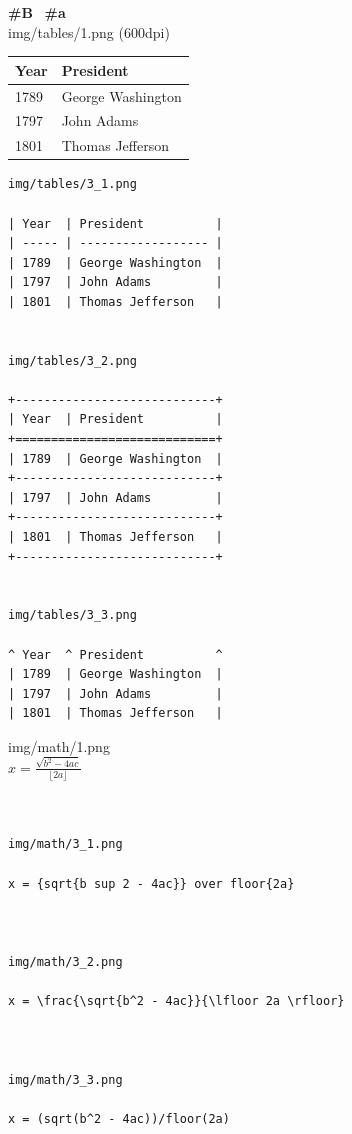 \documentclass[14pt]{article}
\begin{document}
\textbf{\#B} \ \textbf{\#a}\\[1cm]
img/tables/1.png (600dpi)
\begin{table}[H]
\begin{tabular}{| l | l |}
\hline
Year & President \\
\hline
1789 & George Washington \\
\hline
1797 & John Adams \\
\hline
1801 & Thomas Jefferson \\
\hline
\end{tabular}
\end{table}
\noindent
\begin{verbatim}
img/tables/3_1.png

| Year  | President          |
| ----- | ------------------ |
| 1789  | George Washington  |
| 1797  | John Adams         |
| 1801  | Thomas Jefferson   |


img/tables/3_2.png

+----------------------------+
| Year  | President          |
+============================+
| 1789  | George Washington  |
+----------------------------+
| 1797  | John Adams         |
+----------------------------+
| 1801  | Thomas Jefferson   |
+----------------------------+


img/tables/3_3.png

^ Year  ^ President          ^
| 1789  | George Washington  |
| 1797  | John Adams         |
| 1801  | Thomas Jefferson   |

\end{verbatim}


img/math/1.png \\[.5cm]
$x = \frac{\sqrt{b^2-4ac}}{\lfloor2a\rfloor}$

\begin{verbatim}


img/math/3_1.png

x = {sqrt{b sup 2 - 4ac}} over floor{2a}



img/math/3_2.png

x = \frac{\sqrt{b^2 - 4ac}}{\lfloor 2a \rfloor}



img/math/3_3.png

x = (sqrt(b^2 - 4ac))/floor(2a)
\end{verbatim}
\end{document}
